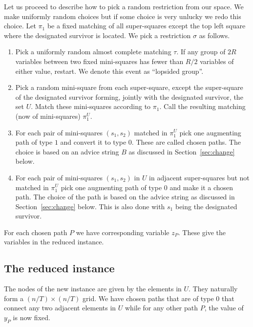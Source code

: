 \documentclass{theoretics}
\begin{document}
Let us proceed to describe how to pick a random restriction from
our space.  We make uniformly 
random choices but if some choice is very unlucky we redo
this choice.   Let $\pi_1$ be a fixed matching of
all super-squares except the top left square where
the designated survivor is located.  We pick a restriction $\sigma$
as follows.  

\begin{enumerate}

\item Pick a uniformly random almost complete matching $\tau$.
If any group of $2R$ variables between two fixed
mini-squares has fewer than $R/2$ variables
of either value, restart.
We denote this event as ``lopsided group''.

\item Pick a random mini-square from each super-square, except
the super-square of the designated survivor forming, jointly
with the designated survivor, the set $U$.
Match these mini-squares according
to $\pi_1$.  Call the resulting matching (now of
mini-squares) $\pi_1^U$.

\item For each pair of mini-squares $(s_1,s_2)$ matched in $\pi_1^U$
pick one augmenting path of type $1$ and convert it to type $0$.
These are called chosen paths.  The choice is based on
an advice string $B$ as discussed in Section~\ref{sec:change}
below.

\item For each pair of mini-squares $(s_1,s_2)$ in $U$ in
adjacent super-squares but not matched in $\pi_1^U$
pick one augmenting path of type $0$ and make it a chosen path.
The choice of the path is based on the advice string as 
discussed in Section~\ref{sec:change} below.
This is also done with $s_1$ being the designated survivor.

\end{enumerate}

For each chosen path $P$ we have corresponding variable
$z_P$.  These give the variables in the reduced instance.

\subsection{The reduced instance}

The nodes of the new instance are given by the elements
in $U$.
They naturally form a $(n/T) \times (n/T)$ grid.
We have chosen paths that are of type $0$ that connect
any two adjacent elements in $U$ while for any other
path $P$, the value of $y_P$ is now fixed. 
\end{document}
